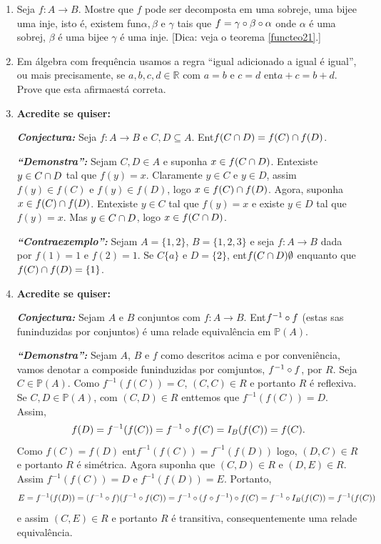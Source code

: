 \begin{enumerate}[{\bf 1.}]
\item Seja $f:A\to B$. Mostre que $f$ pode ser decomposta em uma sobreje\caoi, uma bije\cao e uma inje\caoi, isto \'e, existem fun\coes $\alpha, \beta$ e $\gamma$ tais que $f=\gamma\circ\beta\circ\alpha$ onde $\alpha$ \'e uma sobrej\caoi, $\beta$ \'e uma bije\cao e $\gamma$ \'e uma inje\caoi. [Dica: veja o teorema \ref{functeo21}.]

\item Em \'algebra com frequ\^encia usamos a regra ``igual adicionado a igual \'e igual'', ou mais precisamente, se $a,b,c,d\in\mathbb{R}$ com $a=b$ e $c=d$ ent\ao $a+c=b+d$. Prove que esta afirma\cao est\'a correta.

\item {\bf Acredite se quiser:}  

\noindent \textit{\textbf{Conjectura:}} Seja $f:A\to B$ e $C,D\subseteq A$. Ent\ao $f(C\cap D)=f(C)\cap f(D)$.

\noindent \textit{\textbf{``Demonstra\caoi'':}} Sejam $C,D\in A$ e suponha $x\in f(C\cap D)$. Ent\ao existe $y\in C\cap D$ tal que $f(y)=x$. Claramente $y\in C$ e $y\in D$, assim $f(y)\in f(C)$ e $f(y)\in f(D)$, logo $x\in f(C)\cap f(D)$. Agora, suponha $x\in f(C)\cap f(D)$. Ent\ao existe $y\in C$ tal que $f(y)=x$ e existe $y\in D$ tal que $f(y)=x$. Mas $y\in C\cap D$, logo $x\in f(C\cap D)$. 

\noindent \textit{\textbf{``Contraexemplo'':}} Sejam $A=\{1,2\}$, $B=\{1,2,3\}$ e seja $f:A\to B$ dada por $f(1)=1$ e $f(2)=1$. Se $C\{a\}$ e $D=\{2\}$, ent\ao $f(C\cap D)\emptyset$ enquanto que $f(C)\cap f(D)=\{1\}$. 

\item {\bf Acredite se quiser:}  

\noindent \textit{\textbf{Conjectura:}} Sejam $A$ e $B$ conjuntos com $f:A\to B$. Ent\ao $f^{-1}\circ f$ (estas s\ao as fun\coes induzidas por conjuntos) \'e uma rela\cao de equival\^encia em $\mathbb{P}(A)$.

\noindent \textit{\textbf{``Demonstra\caoi'':}} Sejam $A$, $B$ e $f$ como descritos acima e por conveni\^encia, vamos denotar a composi\cao de fun\coes induzidas por comjuntos, $f^{-1}\circ f$, por $R$. Seja $C\in \mathbb{P}(A)$. Como $f^{-1}(f(C))=C$, $(C,C)\in R$ e portanto $R$ \'e reflexiva. Se $C,D \in \mathbb{P}(A)$, com $(C,D)\in R$ ent\ao temos que $f^{-1}(f(C))=D$. Assim,
\[
f(D)=f^{-1}(f(C))=f^{-1}\circ f(C)=I_B(f(C))=f(C).
\]
Como $f(C)=f(D)$ ent\ao $f^{-1}(f(C))=f^{-1}(f(D))$ logo, $(D,C)\in R$ e portanto $R$ \'e sim\'etrica. Agora suponha que $(C,D)\in R$ e $(D,E)\in R$. Assim $f^{-1}(f(C))=D$ e $f^{-1}(f(D))=E$. Portanto,
\[
E=f^{-1}(f(D))= (f^{-1}\circ f)(f^{-1}\circ f(C))=f^{-1}\circ (f\circ f^{-1})\circ f(C)=f^{-1}\circ I_B(f(C))=f^{-1}(f(C))
\]
e assim $(C,E)\in R$ e portanto $R$ \'e transitiva, consequentemente uma rela\cao de equival\^encia.


\end{enumerate}
